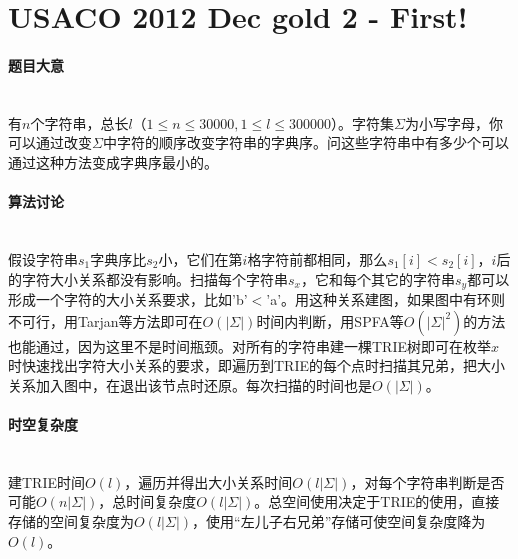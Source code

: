 \documentclass[UTF8]{ctexart}
\newcommand{\myparagraph}[1]{\paragraph{#1}\mbox{}\\}
\theoremstyle{nonumberplain}
\begin{document}
	\section{USACO 2012 Dec gold 2 - First!}
		
		\myparagraph{题目大意}
		
			有$n$个字符串，总长$l$（$1 \leq n \leq 30000, 1 \leq l \leq 300000$）。字符集$\Sigma$为小写字母，你可以通过改变$\Sigma$中字符的顺序改变字符串的字典序。问这些字符串中有多少个可以通过这种方法变成字典序最小的。
		
		\myparagraph{算法讨论}
		
			假设字符串$s_1$字典序比$s_2$小，它们在第$i$格字符前都相同，那么$s_1[i]<s_2[i]$，$i$后的字符大小关系都没有影响。扫描每个字符串$s_x$，它和每个其它的字符串$s_y$都可以形成一个字符的大小关系要求，比如'b'$<$'a'。用这种关系建图，如果图中有环则不可行，用Tarjan等方法即可在$O(|\Sigma|)$时间内判断，用SPFA等$O(|\Sigma|^2)$的方法也能通过，因为这里不是时间瓶颈。对所有的字符串建一棵TRIE树即可在枚举$x$时快速找出字符大小关系的要求，即遍历到TRIE的每个点时扫描其兄弟，把大小关系加入图中，在退出该节点时还原。每次扫描的时间也是$O(|\Sigma|)$。
		
		\myparagraph{时空复杂度}
		
			建TRIE时间$O(l)$，遍历并得出大小关系时间$O(l|\Sigma|)$，对每个字符串判断是否可能$O(n|\Sigma|)$，总时间复杂度$O(l|\Sigma|)$。总空间使用决定于TRIE的使用，直接存储的空间复杂度为$O(l|\Sigma|)$，使用“左儿子右兄弟”存储可使空间复杂度降为$O(l)$。
	
\end{document}
